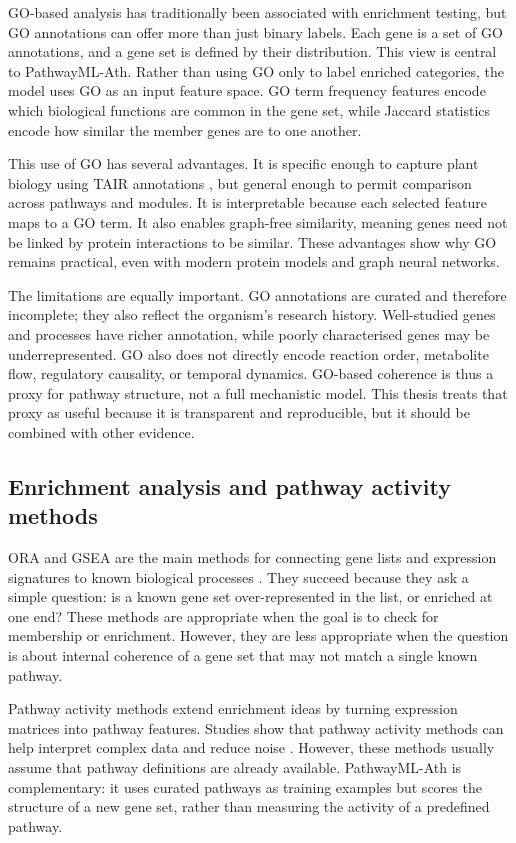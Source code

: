 \documentclass[12pt,twoside]{article}
\begin{document}
GO-based analysis has traditionally been associated with enrichment testing, but GO annotations can offer more than just binary labels. Each gene is a set of GO annotations, and a gene set is defined by their distribution. This view is central to PathwayML-Ath. Rather than using GO only to label enriched categories, the model uses GO as an input feature space. GO term frequency features encode which biological functions are common in the gene set, while Jaccard statistics encode how similar the member genes are to one another.

This use of GO has several advantages. It is specific enough to capture plant biology using TAIR annotations \citep{berardini2015tair}, but general enough to permit comparison across pathways and modules. It is interpretable because each selected feature maps to a GO term. It also enables graph-free similarity, meaning genes need not be linked by protein interactions to be similar. These advantages show why GO remains practical, even with modern protein models and graph neural networks.

The limitations are equally important. GO annotations are curated and therefore incomplete; they also reflect the organism's research history. Well-studied genes and processes have richer annotation, while poorly characterised genes may be underrepresented. GO also does not directly encode reaction order, metabolite flow, regulatory causality, or temporal dynamics. GO-based coherence is thus a proxy for pathway structure, not a full mechanistic model. This thesis treats that proxy as useful because it is transparent and reproducible, but it should be combined with other evidence.

\subsection{Enrichment analysis and pathway activity methods}
\label{sec:lit_enrichment_extended}

ORA and GSEA are the main methods for connecting gene lists and expression signatures to known biological processes \citep{subramanian2005gsea,khatri2012ten}. They succeed because they ask a simple question: is a known gene set over-represented in the list, or enriched at one end? These methods are appropriate when the goal is to check for membership or enrichment. However, they are less appropriate when the question is about internal coherence of a gene set that may not match a single known pathway.

Pathway activity methods extend enrichment ideas by turning expression matrices into pathway features. Studies show that pathway activity methods can help interpret complex data and reduce noise \citep{zhang2020pathway}. However, these methods usually assume that pathway definitions are already available. PathwayML-Ath is complementary: it uses curated pathways as training examples but scores the structure of a new gene set, rather than measuring the activity of a predefined pathway.
\end{document}
